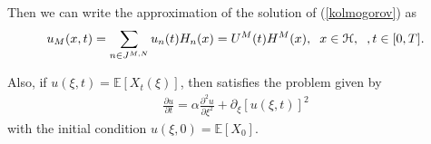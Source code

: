	Then we can write the approximation of the solution of (\ref{kolmogorov}) as
	\begin{align}
		\label{finite_approximation}
		u_M (x, t) = \displaystyle \sum_{ n \in J^{M, N} } u_n (t) H_n (x) = U^M (t) H^M (x), \hspace{2mm} x \in \mathcal{H}, \hspace{2mm}, t \in [0, T].
	\end{align}

	Also, if $u (\xi, t) = \mathbb{E} \left [X_t (\xi) \right]$, then satisfies the problem given by
	\begin{align*}
		\frac{\partial u}{\partial t} = \alpha \frac{\partial^2 u}{\partial \xi^2} + \partial_{\xi} \left[ u(\xi, t) \right]^2
	\end{align*}
	with the initial condition $u(\xi, 0) = \mathbb{E} \left[ X_0 \right]$. 